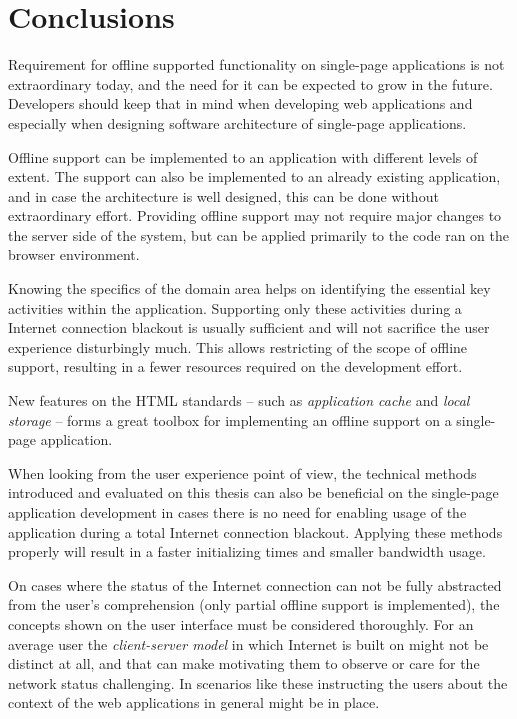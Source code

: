
\chapter{Conclusions}

Requirement for offline supported functionality on single-page applications is not extraordinary today, and the need for it can be expected to grow in the future. Developers should keep that in mind when developing web applications and especially when designing software architecture of single-page applications.

Offline support can be implemented to an application with different levels of extent. The support can also be implemented to an already existing application, and in case the architecture is well designed, this can be done without extraordinary effort. Providing offline support may not require major changes to the server side of the system, but can be applied primarily to the code ran on the browser environment.

Knowing the specifics of the domain area helps on identifying the essential key activities within the application. Supporting only these activities during a Internet connection blackout is usually sufficient and will not sacrifice the user experience disturbingly much. This allows restricting of the scope of offline support, resulting in a fewer resources required on the development effort.

New features on the HTML standards – such as \textit{application cache} and \textit{local storage} – forms a great toolbox for implementing an offline support on a single-page application.

When looking from the user experience point of view, the technical methods introduced and evaluated on this thesis can also be beneficial on the single-page application development in cases there is no need for enabling usage of the application during a total Internet connection blackout. Applying these methods properly will result in a faster initializing times and smaller bandwidth usage.

On cases where the status of the Internet connection can not be fully abstracted from the user's comprehension (only partial offline support is implemented), the concepts shown on the user interface must be considered thoroughly. For an average user the \textit{client-server model} in which Internet is built on might not be distinct at all, and that can make motivating them to observe or care for the network status challenging. In scenarios like these instructing the users about the context of the web applications in general might be in place.

